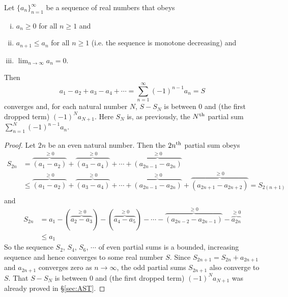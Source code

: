\begingroup
\def\thetheorem{\ref{thm:SRalternating}}
\begin{theorem}
 Let $\big\{a_n\big\}_{n=1}^\infty$
be a sequence of real numbers that obeys
\begin{enumerate}[(i)]\itemsep1pt \parskip0pt  %
\item $a_n\ge 0$ for all $n\ge 1$ and
\item $a_{n+1}\le a_n$  for all $n\ge 1$ (i.e. the
sequence is monotone decreasing) and
\item $\lim_{n\rightarrow\infty}a_n=0$.
\end{enumerate}
Then
\begin{equation*}
a_1-a_2+a_3-a_4+\cdots=\sum\limits_{n=1}^\infty (-1)^{n-1} a_n =S
\end{equation*}
converges and, for each natural number $N$,  $S-S_N$ is between $0$ and (the
first dropped term) $(-1)^N a_{N+1}$. Here $S_N$ is, as previously,
the $N^{\rm th}$ partial sum $\sum\limits_{n=1}^N (-1)^{n-1} a_n$.
\end{theorem}
\addtocounter{theorem}{-1}
\endgroup

\begin{proof}
Let $2n$ be an even natural number. Then the $2n^{\rm th}$ partial sum
obeys
\begin{align*}
S_{2n}&=\overbrace{(a_1-a_2)}^{\ge 0}
                +\overbrace{(a_3-a_4)}^{\ge 0}+\cdots
                +\overbrace{(a_{2n-1}-a_{2n})}^{\ge 0} \\
&\le\overbrace{(a_1-a_2)}^{\ge 0}
                +\overbrace{(a_3-a_4)}^{\ge 0}+\cdots
                +\overbrace{(a_{2n-1}-a_{2n})}^{\ge 0}
                +\overbrace{(a_{2n+1}-a_{2n+2})}^{\ge 0}
  =S_{2(n+1)} \\
\end{align*}
and
\begin{align*}
S_{2n}&=a_1-(\overbrace{a_2-a_3}^{\ge 0})
                         -(\overbrace{a_4-a_5}^{\ge 0})-\cdots
                         -\overbrace{(a_{2n-2}-a_{2n-1})}^{\ge 0}
                         -\overbrace{a_{2n}}^{\ge 0} \\
      &\le a_1
\end{align*}
So the sequence $S_2$, $S_4$, $S_6$, $\cdots$ of even partial sums
is a bounded, increasing sequence and hence converges to some real
number $S$. Since $S_{2n+1} = S_{2n} +a_{2n+1}$ and $a_{2n+1}$
converges zero as $n\rightarrow\infty$, the odd partial sums $S_{2n+1}$
also converge to $S$. That $S-S_N$ is between $0$ and (the
first dropped term) $(-1)^N a_{N+1}$ was already proved
in \S\ref{sec:AST}.
\end{proof}

